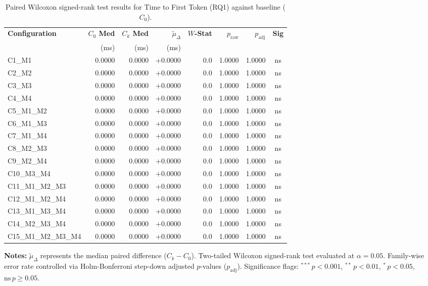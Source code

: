 \begin{table}[!htbp]
\centering
\small
\caption{Paired Wilcoxon signed-rank test results for Time to First Token (RQ1) against baseline ($C_0$).}
\label{tab:wilcoxon_rq1_ttft}
\begin{tabular*}{\textwidth}{@{\extracolsep{\fill}} l r r r r r r c @{}}
\toprule
\textbf{Configuration} & \textbf{$C_0$ Med} & \textbf{$C_k$ Med} & \textbf{$\tilde{\mu}_\Delta$} & \textbf{$W$-Stat} & \textbf{$p_{\text{raw}}$} & \textbf{$p_{\text{adj}}$} & \textbf{Sig} \\
 & \scriptsize{(ms)} & \scriptsize{(ms)} & \scriptsize{(ms)} & & & & \\
\midrule
C1\_M1 & 0.0000 & 0.0000 & +0.0000 & 0.0 & 1.0000 & 1.0000 & ns \\
C2\_M2 & 0.0000 & 0.0000 & +0.0000 & 0.0 & 1.0000 & 1.0000 & ns \\
C3\_M3 & 0.0000 & 0.0000 & +0.0000 & 0.0 & 1.0000 & 1.0000 & ns \\
C4\_M4 & 0.0000 & 0.0000 & +0.0000 & 0.0 & 1.0000 & 1.0000 & ns \\
C5\_M1\_M2 & 0.0000 & 0.0000 & +0.0000 & 0.0 & 1.0000 & 1.0000 & ns \\
C6\_M1\_M3 & 0.0000 & 0.0000 & +0.0000 & 0.0 & 1.0000 & 1.0000 & ns \\
C7\_M1\_M4 & 0.0000 & 0.0000 & +0.0000 & 0.0 & 1.0000 & 1.0000 & ns \\
C8\_M2\_M3 & 0.0000 & 0.0000 & +0.0000 & 0.0 & 1.0000 & 1.0000 & ns \\
C9\_M2\_M4 & 0.0000 & 0.0000 & +0.0000 & 0.0 & 1.0000 & 1.0000 & ns \\
C10\_M3\_M4 & 0.0000 & 0.0000 & +0.0000 & 0.0 & 1.0000 & 1.0000 & ns \\
C11\_M1\_M2\_M3 & 0.0000 & 0.0000 & +0.0000 & 0.0 & 1.0000 & 1.0000 & ns \\
C12\_M1\_M2\_M4 & 0.0000 & 0.0000 & +0.0000 & 0.0 & 1.0000 & 1.0000 & ns \\
C13\_M1\_M3\_M4 & 0.0000 & 0.0000 & +0.0000 & 0.0 & 1.0000 & 1.0000 & ns \\
C14\_M2\_M3\_M4 & 0.0000 & 0.0000 & +0.0000 & 0.0 & 1.0000 & 1.0000 & ns \\
C15\_M1\_M2\_M3\_M4 & 0.0000 & 0.0000 & +0.0000 & 0.0 & 1.0000 & 1.0000 & ns \\
\bottomrule
\end{tabular*}
\vspace{0.5em}
\parbox{\textwidth}{\footnotesize
\textbf{Notes:} $\tilde{\mu}_\Delta$ represents the median paired difference ($C_k - C_0$). Two-tailed Wilcoxon signed-rank test evaluated at $\alpha = 0.05$. Family-wise error rate controlled via Holm-Bonferroni step-down adjusted $p$-values ($p_{\text{adj}}$). Significance flags: $^{***}\,p < 0.001$, $^{**}\,p < 0.01$, $^{*}\,p < 0.05$, $\text{ns}\,p \ge 0.05$.}
\end{table}
